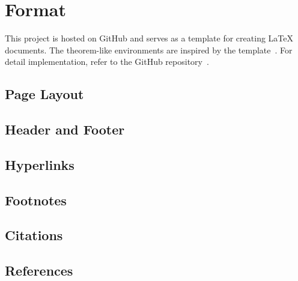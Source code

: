 \section{Format}

This project is hosted on GitHub and serves as a template for creating {\LaTeX} documents. 
The theorem-like environments are inspired by the template~\autocite{sleepymalc2022template}.
For detail implementation, refer to the GitHub repository~\autocite{chang2025document}.

\subsection{Page Layout}

\subsection{Header and Footer}

\subsection{Hyperlinks}

\subsection{Footnotes}

\subsection{Citations}

\subsection{References}